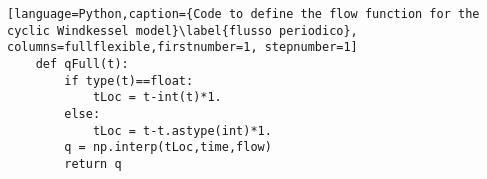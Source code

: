 \begin{lstlisting}[language=Python,caption={Code to define the flow function for the cyclic Windkessel model}\label{flusso periodico}, columns=fullflexible,firstnumber=1, stepnumber=1]
    def qFull(t):
        if type(t)==float:
            tLoc = t-int(t)*1.
        else:
            tLoc = t-t.astype(int)*1.
        q = np.interp(tLoc,time,flow)
        return q
\end{lstlisting}